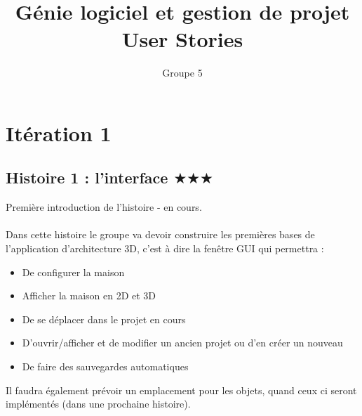 \documentclass[12pt,a4paper]{article}
\title{Génie logiciel et gestion de projet \\ User Stories}
\author{Groupe 5}
\begin{document}
\maketitle

\newpage
\section{Itération 1}
	\subsection{Histoire 1 : l'interface $\bigstar\bigstar\bigstar$}
		Première introduction de l'histoire - en cours.
		\\ \\
		Dans cette histoire le groupe va devoir construire les premières bases de l'application d'architecture 3D, c'est à dire la fenêtre GUI qui permettra :
		\begin{itemize}
			\item De configurer la maison
			\item Afficher la maison en 2D et 3D
			\item De se déplacer dans le projet en cours
			\item D'ouvrir/afficher et de modifier un ancien projet ou d'en créer un nouveau
			\item De faire des sauvegardes automatiques
		\end{itemize}
		Il faudra également prévoir un emplacement pour les objets, quand ceux ci seront implémentés (dans une prochaine histoire).
		
	
\end{document}

